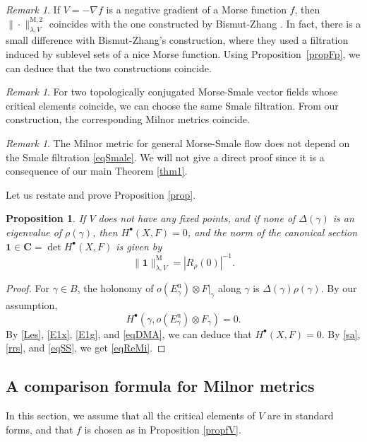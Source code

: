 \documentclass[JEP,XML,SOM,Unicode]{cedram}
\newcommand{\sbullet}{{\scriptscriptstyle\bullet}}
\newcommand{\ru}{\mathrm{u}}
\newcommand{\rM}{\mathrm{M}}
\theoremstyle{plain}
\newtheorem{prop}[lem]{Proposition}
\theoremstyle{definition}
\theoremstyle{remark}
\newtheorem{re}[lem]{Remark}
\newcommand{\bC}{\mathbf{C}}
\begin{document}
\begin{re}
If $V=-\nabla f$ is a negative gradient of a Morse function $f$, then
$\|{\cdot}\|^{\rM,2}_{\lambda,V}$ coincides with the one constructed by
Bismut-Zhang \cite[Def.\,1.9]{BZ92}.
In fact, there is a small difference with Bismut-Zhang's
construction, where they used a filtration \cite[(1.37)]{BZ92} induced
by sublevel sets of a nice Morse function. Using Proposition~\ref{propFp}, we can deduce that the two constructions coincide.
\end{re}

\begin{re}\label{reDMA}
For two topologically conjugated Morse-Smale vector fields whose
critical elements coincide, we can choose the same Smale filtration. From our construction, the corresponding Milnor metrics coincide.
\end{re}

\begin{re}
The Milnor metric for
general Morse-Smale flow does not depend on the Smale
filtration \eqref{eqSmale}. We will not give a direct proof since it is a consequence of our main Theorem \ref{thm1}.
\end{re}

Let us restate and prove Proposition \ref{prop}.

\begin{prop}\label{Prop}
If $V$ does not have any fixed points, and
if none of $\Delta(\gamma)$ is an eigenvalue of $\rho(\gamma)$, then
$H^{\sbullet}(X,F)=0$, and the norm of the canonical section
$\mathbf{1}\in \bC=\det H^{\sbullet}(X,F)$ is given by
\begin{equation}\label{eqReMi}
\|\mathbf{1}\|^{\rM}_{\lambda,V}=|R_{\rho}(0)|^{-1}.
\end{equation}
\end{prop}
\begin{proof}
For $\gamma\in B$, the holonomy of $o(E_{\gamma}^{\ru})\otimes
F|_{\gamma}$
along $\gamma$ is $\Delta(\gamma)\rho(\gamma)$. By our
assumption,
\begin{equation}\label{eqDMA}
H^{\sbullet}(\gamma,o(E_{\gamma}^{\ru})\otimes
F_{\gamma})=0.
\end{equation}
By \eqref{Les}, \eqref{E1x}, \eqref{E1g}, and \eqref{eqDMA}, we can deduce that $H^{\sbullet}(X,F)=0$. By
\eqref{sa}, \eqref{rrs}, and \eqref{eqSS}, we get
\eqref{eqReMi}.
\end{proof}

\subsection{A comparison formula for Milnor metrics}\label{sCMM}
In this section, we assume that all the critical elements of
$V$ are in standard forms, and that $f$ is chosen as in
Proposition \ref{propfV}.
\end{document}

